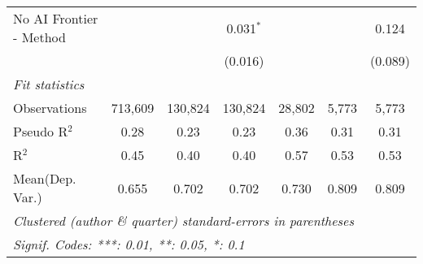 \begin{tabular}{lcccccc}
   No AI Frontier - Method &               &               & 0.031$^{*}$   &              &         & 0.124\\   
                           &               &               & (0.016)       &              &         & (0.089)\\   
   \midrule
   \emph{Fit statistics}\\
   Observations            & 713,609       & 130,824       & 130,824       & 28,802       & 5,773   & 5,773\\  
   Pseudo R$^2$            & 0.28          & 0.23          & 0.23          & 0.36         & 0.31    & 0.31\\  
   R$^2$                   & 0.45          & 0.40          & 0.40          & 0.57         & 0.53    & 0.53\\  
Mean(Dep. Var.) & 0.655 & 0.702 & 0.702 & 0.730 & 0.809 & 0.809 \\
   \midrule \midrule
   \multicolumn{7}{l}{\emph{Clustered (author \& quarter) standard-errors in parentheses}}\\
   \multicolumn{7}{l}{\emph{Signif. Codes: ***: 0.01, **: 0.05, *: 0.1}}\\
\end{tabular}
\par\endgroup

